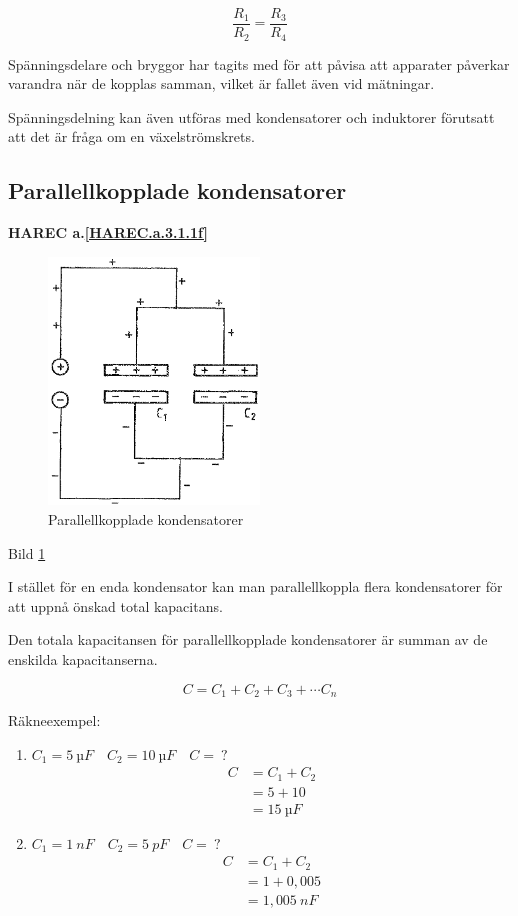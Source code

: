 \[\frac{R_1}{R_2} = \frac{R_3}{R_4}\]

Spänningsdelare och bryggor har tagits med för att påvisa att apparater påverkar
varandra när de kopplas samman, vilket är fallet även vid mätningar.

Spänningsdelning kan även utföras med kondensatorer och induktorer förutsatt att
det är fråga om en växelströmskrets.

\subsection{Parallellkopplade kondensatorer}
\textbf{HAREC a.\ref{HAREC.a.3.1.1f}\label{myHAREC.a.3.1.1f}}

\begin{figure}
\includegraphics[width=0.5\textwidth]{images/bild_2_3-05.png}
\caption{Parallellkopplade kondensatorer}
\label{fig:BildII3-05}
\end{figure}

Bild \ref{fig:BildII3-05}

I stället för en enda kondensator kan man parallellkoppla flera kondensatorer
för att uppnå önskad total kapacitans.

Den totala kapacitansen för parallellkopplade kondensatorer är summan av de
enskilda kapacitanserna.

\[C = C_1 + C_2 + C_3 + \cdots C_n\]

Räkneexempel:
\begin{enumerate}
\item \(C_1 = 5\ µF \quad C_2 = 10\ µF \quad C =\ ?\)
  \begin{align*}
    C &= C_1 + C_2 \\
    &= 5 + 10 \\
    &= 15\ µF
  \end{align*}
\item \(C_1 = 1\ nF \quad C_2 = 5\ pF \quad C =\ ?\)
  \begin{align*}
    C &= C_1 + C_2 \\
    &= 1 + 0,005 \\
    &= 1,005\ nF
  \end{align*}
\end{enumerate}

